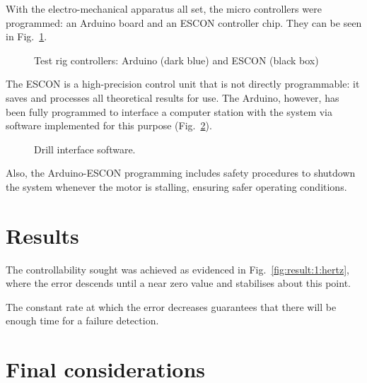\documentclass[final]{beamer}
\begin{document}
\begin{frame}[t]{}
\begin{multicols}{3}
			With the electro-mechanical apparatus all set, the micro controllers were
			programmed: an Arduino board and an ESCON controller chip. They
			can be seen in Fig.~\ref{fig:control}.
			
			\begin{figure}[h]
				\begin{center}
					\caption{Test rig controllers: Arduino (dark blue) and ESCON (black box) \label{fig:control}}
				\end{center}
			\end{figure}
			
			The ESCON is a high-precision control unit that is not directly
			programmable: it saves and processes all theoretical results for use. The Arduino,
			however, has been fully programmed to interface a computer station with the system
			via software implemented for this purpose (Fig.~\ref{fig:interface}).
			
			\begin{figure}[h]
				\begin{center}
					\caption{Drill interface software. \label{fig:interface}}
				\end{center}
			\end{figure}
			
			Also, the Arduino-ESCON programming includes safety procedures
			to shutdown the system whenever the motor is stalling, ensuring safer operating
			conditions.
			
			\section{Results}
			
			The controllability sought was achieved as evidenced in Fig.~\ref{fig:result:1:hertz},
			where the error descends until a near zero value and stabilises about this point.
			
			\begin{figure}[h]
				\begin{center}
				\end{center}
			\end{figure}
			
			The constant rate at which the error decreases guarantees that there will
			be enough time for a failure detection.
			
			\section{Final considerations}
			

\end{multicols}
\end{frame}
\end{document}
